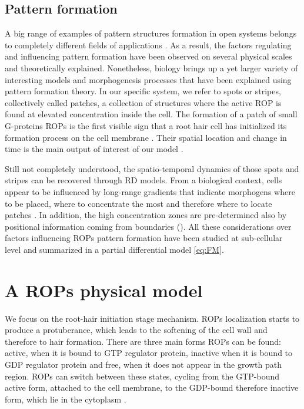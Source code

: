 \subsection{Pattern formation}
A big range of examples of pattern structures formation in open systems belongs to completely different fields of applications \cite{phd:4_pattern}. As a result, the factors regulating and influencing pattern formation have been observed on several physical scales and theoretically explained. Nonetheless, biology brings up a yet larger variety of interesting models and morphogenesis processes that have been explained using pattern formation theory. In our specific system, we refer to spots or stripes, collectively called patches, a collection of structures where the active ROP is found at elevated concentration inside the cell. The formation of a patch of small G-proteins ROPs is the first visible sign that a root hair cell has initialized its formation process on the cell membrane \cite{intra1_R:13_pattern}. Their spatial location and change in time is the main output of interest of our model \cite{intra2:4_victor, payne, intra2:12_GTP}.

Still not completely understood, the spatio-temporal dynamics of those spots and stripes can be recovered through RD models. From a biological context, cells appear to be influenced by long-range gradients that indicate morphogens where to be placed, where to concentrate the most and therefore where to locate patches \cite{intra:Krup}. In addition, the high concentration zones are pre-determined also by positional information coming from boundaries (\cite{jones}). All these considerations over factors influencing ROPs pattern formation have been studied at sub-cellular level and summarized in a partial differential model \eqref{eq:FM}.

\section{A ROPs physical model}
We focus on the root-hair initiation stage mechanism. ROPs localization starts to produce a protuberance, which leads to the softening of the cell wall and therefore to hair formation. There are three main forms ROPs can be found: active, when it is bound to GTP regulator protein, inactive when it is bound to GDP regulator protein and free, when it does not appear in the growth path region. ROPs can switch between these states, cycling from  the GTP-bound  active form, attached to the cell membrane, to the GDP-bound therefore inactive form, which lie in the cytoplasm  \cite{phd:67_hill, intra2:12_GTP}.

